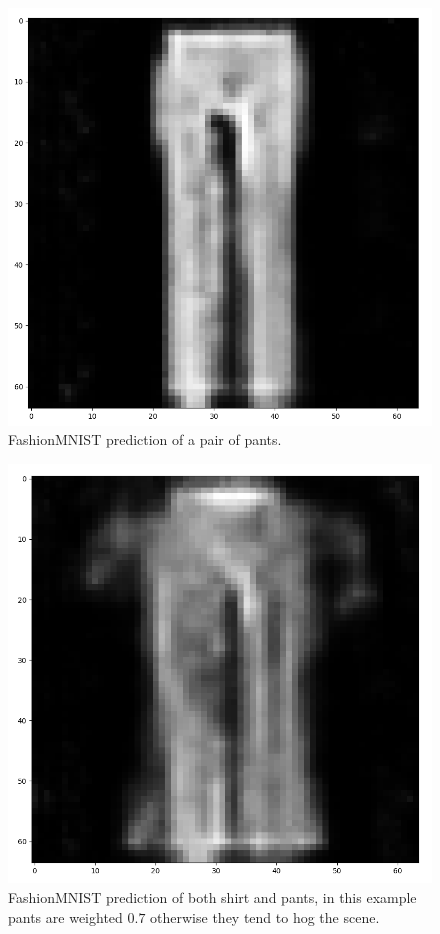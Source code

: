 \documentclass[10pt,twocolumn,letterpaper]{article}
\begin{document}
\begin{figure}
   \centering
   \includegraphics[scale=0.39]{images/pants.png}
   \caption{FashionMNIST prediction of a pair of pants.}
   \label{fig:fashion-pants}
\end{figure}

\begin{figure}
   \centering
   \includegraphics[scale=0.39]{images/shirtpants-weighted.png}
   \caption{FashionMNIST prediction of both shirt and pants, in this example pants are weighted $0.7$ otherwise they tend to hog the scene.}
   \label{fig:fashion-shirt-pants}
\end{figure}

{\small


}
\end{document}
